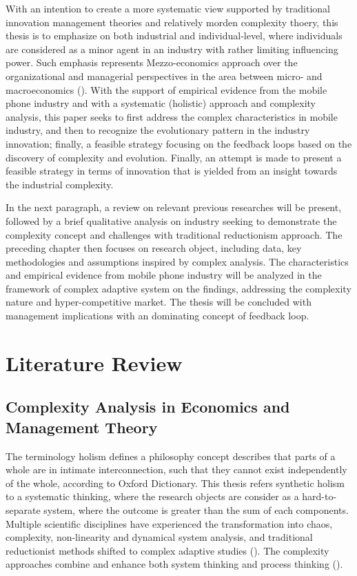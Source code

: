 \documentclass[utf8,english]{gradu3}
\begin{document}
With an intention to create a more systematic view supported by traditional innovation management theories and relatively morden complexity thoery, this thesis is to emphasize on both industrial and individual-level, where individuals are considered as a minor agent in an industry with rather limiting influencing power. Such emphasis represents Mezzo-economics approach over the organizational and managerial perspectives in the area between micro- and macroeconomics (\cite{kozuharov2011mezzo}). With the support of empirical evidence from the mobile phone industry and with a systematic (holistic) approach and complexity analysis, this paper seeks to first address the complex characteristics in mobile industry, and then to recognize the evolutionary pattern in the industry innovation; finally, a feasible strategy focusing on the feedback loops based on the discovery of complexity and evolution. Finally, an attempt is made to present a feasible strategy in terms of innovation that is yielded from an insight towards the industrial complexity. 

In the next paragraph, a review on relevant previous researches will be present, followed by a brief qualitative analysis on industry seeking to demonstrate the complexity concept and challenges with traditional reductionism approach. The preceding chapter then focuses on research object, including data, key methodologies and assumptions inspired by complex analysis. The characteristics and empirical evidence from mobile phone industry will be analyzed in the framework of complex adaptive system on the findings, addressing the complexity nature and hyper-competitive market. The thesis will be concluded with management implications with an dominating concept of feedback loop.

\chapter{Literature Review}

\section{Complexity Analysis in Economics and Management Theory}

The terminology holism defines a philosophy concept describes that parts of a whole are in intimate interconnection, such that they cannot exist independently of the whole, according to Oxford Dictionary. This thesis refers synthetic holism to a systematic thinking, where the research objects are consider as a hard-to-separate system, where the outcome is greater than the sum of each components. Multiple scientific disciplines have experienced the transformation into chaos, complexity, non-linearity and dynamical system analysis, and traditional reductionist methods shifted to complex adaptive studies (\cite{urry2005complexity}). The complexity approaches combine and enhance both system thinking and process thinking (\cite{thrift1999place}). 
\end{document}
